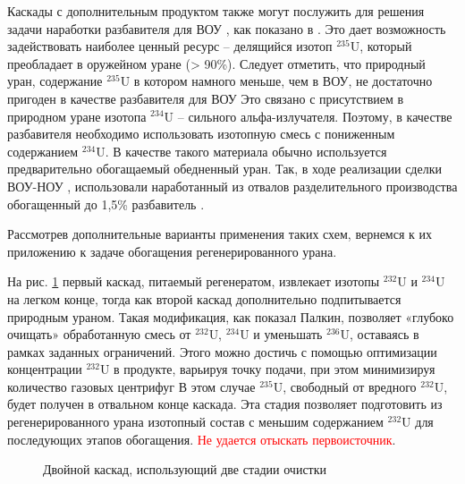 Каскады с дополнительным продуктом также могут послужить для решения задачи наработки разбавителя для ВОУ \cite{palkinPOLUChENIERAZBAVITELYaDLYa2017}, как показано в \cite{shopenSposobPolucheniyaRazbavitelya2008}.
Это дает возможность задействовать наиболее ценный ресурс -- делящийся изотоп $^{235}$U, который преобладает в оружейном уране (> 90\%).
Следует отметить, что природный уран, содержание $^{235}$U в котором намного меньше, чем в ВОУ, не достаточно пригоден в качестве разбавителя для ВОУ
Это связано с присутствием в природном уране изотопа $^{234}$U -- сильного альфа-излучателя.
Поэтому, в качестве разбавителя необходимо использовать изотопную смесь с пониженным содержанием $^{234}$U.
В качестве такого материала обычно используется предварительно обогащаемый обедненный уран.
Так, в ходе реализации сделки ВОУ-НОУ \cite{korotkevichRealizaciyaProgrammyVOUNOU2003}, использовали наработанный из отвалов разделительного производства обогащенный до 1,5\% разбавитель \cite{SposobPolucheniyaRazbavitelya}.

Рассмотрев дополнительные варианты применения таких схем, вернемся к их приложению к задаче обогащения регенерированного урана.

На рис. \ref{fig:double_palk} первый каскад, питаемый регенератом, извлекает изотопы $^{232}$U и $^{234}$U на легком конце, тогда как второй каскад дополнительно подпитывается природным ураном.
Такая модификация, как показал Палкин, позволяет «глубоко очищать» обработанную смесь от $^{232}$U, $^{234}$U и уменьшать  $^{236}$U, оставаясь в рамках заданных ограничений.
Этого можно достичь с помощью оптимизации концентрации $^{232}$U в продукте, варьируя точку подачи, при этом минимизируя количество газовых центрифуг
В этом случае $^{235}$U, свободный от вредного $^{232}$U, будет получен в отвальном конце каскада.
Эта стадия позволяет подготовить из регенерированного урана изотопный состав с меньшим содержанием $^{232}$U для последующих этапов обогащения. \textcolor{red}{Не удается отыскать первоисточник}.
\begin{figure}[ht]
  \caption{Двойной каскад, использующий две стадии очистки}\label{fig:double_palk}
\end{figure}

